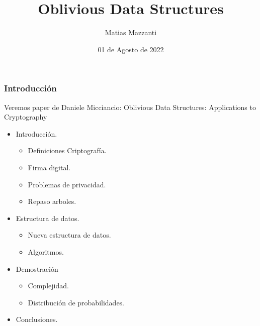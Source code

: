 \documentclass[10pt]{beamer}
\title[Algoritmos y estructuras de datos 2]{Oblivious Data Structures}
\author[Matias Mazzanti]{Matias Mazzanti}
\institute{DC-UBA}
\date{01 de Agosto de 2022}
\begin{document}
\begin{frame}

\maketitle

\end{frame}
\section{}
\begin{frame}
\frametitle{Introducción}
\begin{mdframed}[backgroundcolor=frenchblue!20]
 Veremos paper de Daniele Micciancio: Oblivious Data Structures: Applications to Cryptography
\end{mdframed}
\pause
\begin{itemize}\itemsep-1em
   \item Introducción.
     \vspace{-0.3cm}
  \begin{itemize}\itemsep-1em
     \item Definiciones Criptografía.
      \item Firma digital.
      \item Problemas de privacidad.
      \item Repaso arboles.
  \end{itemize}\pause
\item Estructura de datos.
     \vspace{-0.3cm}
  \begin{itemize}\itemsep-1em
      \item Nueva estructura de datos.
      \item Algoritmos.
  \end{itemize}\pause
  \item Demostración
     \vspace{-0.3cm}
  \begin{itemize}\itemsep-1em
     \item Complejidad.
    \item Distribución de probabilidades.
  \end{itemize}
    \item Conclusiones.
\end{itemize}
\end{frame}
\end{document}
